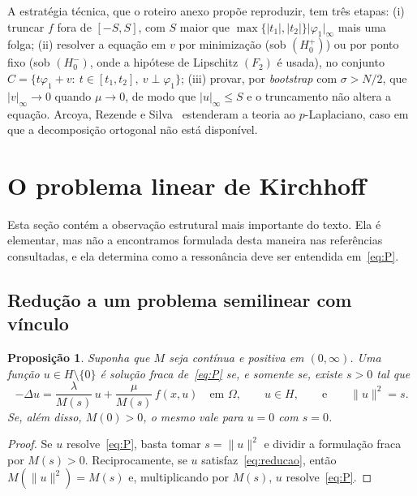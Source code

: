 \documentclass[11pt,a4paper]{article}
\theoremstyle{plain}
\newtheorem{proposicao}[teorema]{Proposição}
\theoremstyle{definition}
\theoremstyle{remark}
\newcommand{\norm}[1]{\lVert #1\rVert}
\newcommand{\abs}[1]{\lvert #1\rvert}
\begin{document}
A estratégia técnica, que o roteiro anexo propõe reproduzir, tem três etapas:
(i) truncar $f$ fora de $[-S,S]$, com $S$ maior que
$\max\{\abs{t_1},\abs{t_2}\}\abs{\varphi_1}_\infty$ mais uma folga;
(ii) resolver a equação em $v$ por minimização (sob $(H_0^+)$) ou por ponto fixo
(sob $(H_0^-)$, onde a hipótese de Lipschitz $(F_2)$ é usada), no conjunto
$C=\{t\varphi_1+v:\ t\in[t_1,t_2],\ v\perp\varphi_1\}$;
(iii) provar, por \emph{bootstrap} com $\sigma>N/2$, que
$\abs{v}_\infty\to0$ quando $\mu\to0$, de modo que $\abs{u}_\infty\le S$ e o
truncamento não altera a equação. Arcoya, Rezende e
Silva~\cite{ArcoyaRezendeSilva2019} estenderam a teoria ao $p$-Laplaciano, caso
em que a decomposição ortogonal não está disponível.

\section{O problema linear de Kirchhoff}\label{sec:espectro}

Esta seção contém a observação estrutural mais importante do texto. Ela é
elementar, mas não a encontramos formulada desta maneira nas referências
consultadas, e ela determina como a ressonância deve ser entendida
em~\eqref{eq:P}.

\subsection{Redução a um problema semilinear com vínculo}

\begin{proposicao}\label{prop:reducao}
Suponha que $M$ seja contínua e positiva em $(0,\infty)$. Uma função
$u\in H\setminus\{0\}$ é solução fraca de~\eqref{eq:P} se, e somente se, existe
$s>0$ tal que
\begin{equation}\label{eq:reducao}
-\Delta u=\frac{\lambda}{M(s)}\,u+\frac{\mu}{M(s)}\,f(x,u)\quad\text{em }\Omega,
\qquad u\in H,\qquad\text{e}\qquad \norm{u}^2=s .
\end{equation}
Se, além disso, $M(0)>0$, o mesmo vale para $u=0$ com $s=0$.
\end{proposicao}

\begin{proof}
Se $u$ resolve~\eqref{eq:P}, basta tomar $s=\norm{u}^2$ e dividir a formulação
fraca por $M(s)>0$. Reciprocamente, se $u$ satisfaz~\eqref{eq:reducao}, então
$M(\norm{u}^2)=M(s)$ e, multiplicando por $M(s)$, $u$ resolve~\eqref{eq:P}.
\end{proof}
\end{document}
